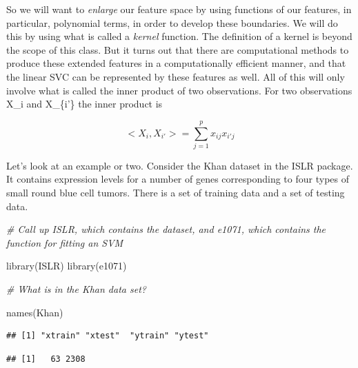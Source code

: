 \documentclass[
]{article}
\newenvironment{Shaded}{\begin{snugshade}}{\end{snugshade}}
\newcommand{\CommentTok}[1]{\textcolor[rgb]{0.56,0.35,0.01}{\textit{#1}}}
\newcommand{\FunctionTok}[1]{\textcolor[rgb]{0.00,0.00,0.00}{#1}}
\newcommand{\NormalTok}[1]{#1}
\newcommand{\SpecialCharTok}[1]{\textcolor[rgb]{0.00,0.00,0.00}{#1}}
\begin{document}
So we will want to \emph{enlarge} our feature space by using functions
of our features, in particular, polynomial terms, in order to develop
these boundaries. We will do this by using what is called a
\emph{kernel} function. The definition of a kernel is beyond the scope
of this class. But it turns out that there are computational methods to
produce these extended features in a computationally efficient manner,
and that the linear SVC can be represented by these features as well.
All of this will only involve what is called the inner product of two
observations. For two observations X\_i and X\_\{i'\} the inner product
is

\begin{equation}

<X_i, X_{i'}> = \sum_{j=1}^{p} {x_{ij}x_{i'j}}

\end{equation}

Let's look at an example or two. Consider the Khan dataset in the ISLR
package. It contains expression levels for a number of genes
corresponding to four types of small round blue cell tumors. There is a
set of training data and a set of testing data.

\begin{Shaded}
\begin{Highlighting}[]
\CommentTok{\# Call up ISLR, which contains the dataset, and e1071, which contains the function for fitting an SVM}

\FunctionTok{library}\NormalTok{(ISLR)}
\FunctionTok{library}\NormalTok{(e1071)}

\CommentTok{\# What is in the Khan data set?}

\FunctionTok{names}\NormalTok{(Khan)}
\end{Highlighting}
\end{Shaded}

\begin{verbatim}
## [1] "xtrain" "xtest"  "ytrain" "ytest"
\end{verbatim}

\begin{Shaded}
\end{Shaded}

\begin{verbatim}
## [1]   63 2308
\end{verbatim}
\end{document}
